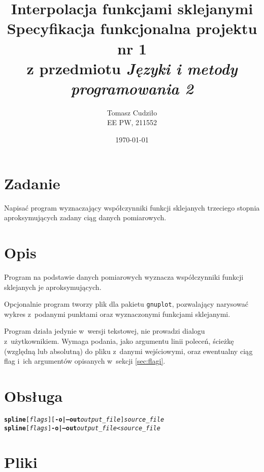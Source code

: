 \documentclass[12pt,a4paper]{article}
\newcommand{\prog}[1]{\texttt{#1}}
\newcommand{\flag}[1]{\textbf{\prog{#1}}}
\begin{document}
\title{ 
  Interpolacja funkcjami sklejanymi\\
	{\normalsize Specyfikacja funkcjonalna projektu nr 1}\\\vspace{-12pt}
	{\normalsize z przedmiotu \emph{Języki i metody programowania 2}}
}
\author{
  Tomasz Cudziło\\
  {\small EE PW, 211552}
}
\date{\today}
\maketitle

\section*{Zadanie}
\label{sec:zadanie}

Napisać program wyznaczający współczynniki funkcji sklejanych trzeciego stopnia
aproksymujących zadany ciąg danych pomiarowych.

\vspace{24pt}

\section{Opis}
\label{sec:opis}

Program na podstawie danych pomiarowych wyznacza współczynniki funkcji
sklejanych je aproksymujących.

Opcjonalnie program tworzy plik dla pakietu \prog{gnuplot}, pozwalający
narysować wykres z~podanymi punktami oraz wyznaczonymi funkcjami sklejanymi.

Program działa jedynie w~wersji tekstowej, nie prowadzi dialogu
z~użytkownikiem. Wymaga podania, jako argumentu linii poleceń, ścieżkę
(względną lub absolutną) do pliku z~danymi wejściowymi, oraz ewentualny ciąg
flag i~ich argumentów opisanych w~sekcji \ref{sec:flagi}.

\section{Obsługa}

\begin{alltt}
\textbf{spline} [\textsl{flags}] [\flag{-o|--out} \textsl{output\_file}] \textsl{source\_file}
\textbf{spline} [\textsl{flags}] \flag{-o|--out} \textsl{output\_file} < \textsl{source\_file}
\end{alltt}

\section{Pliki}
\label{sec:pliki}
\end{document}
